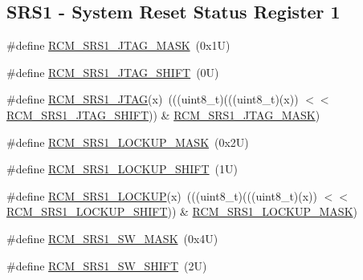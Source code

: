 \subsection*{S\+R\+S1 -\/ System Reset Status Register 1}
\begin{DoxyCompactItemize}
\item 
\#define \mbox{\hyperlink{group___r_c_m___register___masks_ga636e5479adb4c5dba899a740ca14af5f}{R\+C\+M\+\_\+\+S\+R\+S1\+\_\+\+J\+T\+A\+G\+\_\+\+M\+A\+SK}}~(0x1\+U)
\item 
\#define \mbox{\hyperlink{group___r_c_m___register___masks_ga1184957c2244e1d98aed4a802ca8534d}{R\+C\+M\+\_\+\+S\+R\+S1\+\_\+\+J\+T\+A\+G\+\_\+\+S\+H\+I\+FT}}~(0\+U)
\item 
\#define \mbox{\hyperlink{group___r_c_m___register___masks_gaa58d3221f9fba8f3b3dbb35f2ae310fc}{R\+C\+M\+\_\+\+S\+R\+S1\+\_\+\+J\+T\+AG}}(x)~(((uint8\+\_\+t)(((uint8\+\_\+t)(x)) $<$$<$ \mbox{\hyperlink{group___r_c_m___register___masks_ga1184957c2244e1d98aed4a802ca8534d}{R\+C\+M\+\_\+\+S\+R\+S1\+\_\+\+J\+T\+A\+G\+\_\+\+S\+H\+I\+FT}})) \& \mbox{\hyperlink{group___r_c_m___register___masks_ga636e5479adb4c5dba899a740ca14af5f}{R\+C\+M\+\_\+\+S\+R\+S1\+\_\+\+J\+T\+A\+G\+\_\+\+M\+A\+SK}})
\item 
\#define \mbox{\hyperlink{group___r_c_m___register___masks_ga4f7c4ce64c13c55fc0c7aaea3a702a03}{R\+C\+M\+\_\+\+S\+R\+S1\+\_\+\+L\+O\+C\+K\+U\+P\+\_\+\+M\+A\+SK}}~(0x2\+U)
\item 
\#define \mbox{\hyperlink{group___r_c_m___register___masks_ga71f857503a2b2d2e0c30d4762e89a8d8}{R\+C\+M\+\_\+\+S\+R\+S1\+\_\+\+L\+O\+C\+K\+U\+P\+\_\+\+S\+H\+I\+FT}}~(1\+U)
\item 
\#define \mbox{\hyperlink{group___r_c_m___register___masks_ga3f79a81c77e80752d0fed127cee7eb3f}{R\+C\+M\+\_\+\+S\+R\+S1\+\_\+\+L\+O\+C\+K\+UP}}(x)~(((uint8\+\_\+t)(((uint8\+\_\+t)(x)) $<$$<$ \mbox{\hyperlink{group___r_c_m___register___masks_ga71f857503a2b2d2e0c30d4762e89a8d8}{R\+C\+M\+\_\+\+S\+R\+S1\+\_\+\+L\+O\+C\+K\+U\+P\+\_\+\+S\+H\+I\+FT}})) \& \mbox{\hyperlink{group___r_c_m___register___masks_ga4f7c4ce64c13c55fc0c7aaea3a702a03}{R\+C\+M\+\_\+\+S\+R\+S1\+\_\+\+L\+O\+C\+K\+U\+P\+\_\+\+M\+A\+SK}})
\item 
\#define \mbox{\hyperlink{group___r_c_m___register___masks_ga72f541acd2a0992ad0d1d089c694ad5f}{R\+C\+M\+\_\+\+S\+R\+S1\+\_\+\+S\+W\+\_\+\+M\+A\+SK}}~(0x4\+U)
\item 
\#define \mbox{\hyperlink{group___r_c_m___register___masks_ga7e554c1ae96dae684fbc81204283f86c}{R\+C\+M\+\_\+\+S\+R\+S1\+\_\+\+S\+W\+\_\+\+S\+H\+I\+FT}}~(2\+U)

\end{DoxyCompactItemize}
